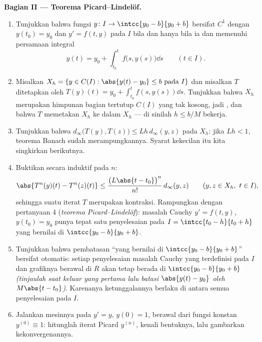 \begin{problem}
\medskip
\noindent\textbf{Bagian II --- Teorema Picard--Lindelöf.}
\begin{enumerate}[resume]
  \item Tunjukkan bahwa fungsi $y \colon I \to \intcc{y_0 - b}{y_0
        + b}$ bersifat $C^1$ dengan $y(t_0) = y_0$ dan $y' = f(t, y)$
        pada $I$ bila dan hanya bila ia  dan memenuhi
        persamaan integral
        \[
        y(t) = y_0 + \int_{t_0}^{t} f\bigl(s, y(s)\bigr)\dd s
        \qquad (t \in I).
        \]
  \item Misalkan $X_h = \{y \in C(I) : \abs{y(t) - y_0} \leq b
        \text{ pada } I\}$ dan misalkan $T$ ditetapkan oleh $T(y)(t) =
        y_0 + \int_{t_0}^{t}f(s, y(s))\dd s$. Tunjukkan bahwa $X_h$
        merupakan himpunan bagian tertutup $C(I)$ yang tak kosong, jadi
        , dan bahwa $T$ memetakan $X_h$ ke dalam $X_h$ ---
        di sinilah $h \leq b/M$ bekerja.
  \item Tunjukkan bahwa $d_\infty\bigl(T(y), T(z)\bigr) \leq
        Lh\,d_\infty(y, z)$ pada $X_h$: jika $Lh < 1$, teorema Banach
        sudah merampungkannya. Syarat kekecilan itu kita singkirkan berikutnya.
  \item Buktikan secara induktif pada $n$:
        \[
        \abs{T^n(y)(t) - T^n(z)(t)} \leq
        \frac{\bigl(L\abs{t - t_0}\bigr)^n}{n!}\,
        d_\infty(y, z) \qquad (y, z \in X_h,\ t \in I),
        \]
        sehingga suatu iterat $T$ merupakan kontraksi. Rampungkan dengan
        pertanyaan 4 (\emph{teorema Picard--Lindelöf}): masalah
        Cauchy $y' = f(t,y)$, $y(t_0) = y_0$ punya tepat
        satu penyelesaian pada $I = \intcc{t_0 - h}{t_0 + h}$ yang
        bernilai di $\intcc{y_0 - b}{y_0 + b}$.
  \item Tunjukkan bahwa pembatasan ``yang bernilai di $\intcc{y_0 -
        b}{y_0 + b}$'' bersifat otomatis: setiap penyelesaian masalah
        Cauchy yang terdefinisi pada $I$ dan grafiknya berawal di $R$
        akan tetap berada di $\intcc{y_0 - b}{y_0 + b}$ \emph{(tinjaulah
        saat keluar yang pertama lalu batasi $\abs{y(t) - y_0}$ oleh
        $M\abs{t - t_0}$)}. Karenanya ketunggalannya berlaku di antara
        semua penyelesaian pada $I$.
  \item Jalankan mesinnya pada $y' = y$, $y(0) = 1$, berawal dari
        fungsi konstan $y^{(0)} \equiv 1$: hitunglah iterat
        Picard $y^{(n)}$, kenali bentuknya, lalu gambarkan
        kekonvergenannya.
\end{enumerate}


\end{problem}
